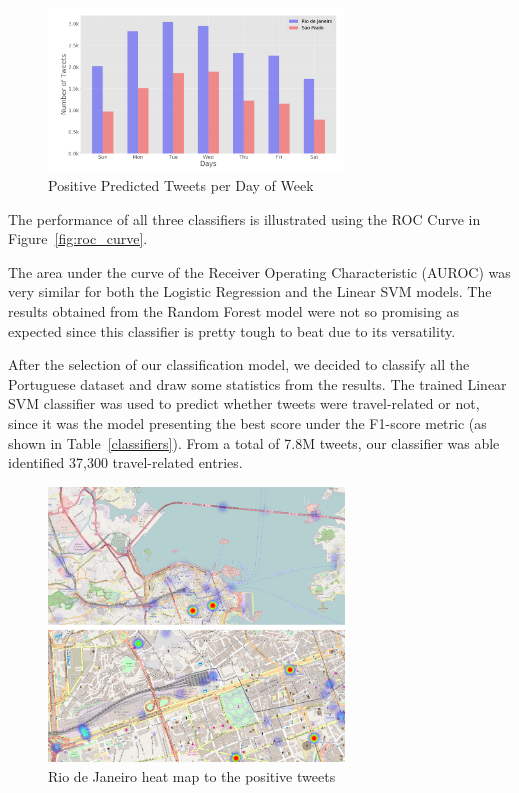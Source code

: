 \begin{figure}[!hbp]
	\centering
	\includegraphics[width=0.7\textwidth]{figures/predicted_day_of_week}
	\caption{Positive Predicted Tweets per Day of Week}
	\label{fig:predicted}
\end{figure}


The performance of all three classifiers is illustrated using the ROC Curve in Figure~\ref{fig:roc_curve}.

The area under the curve of the Receiver Operating Characteristic (AUROC) was very similar for both the Logistic Regression and the Linear SVM models. The results obtained from the Random Forest model were not so promising as expected since this classifier is pretty tough to beat due to its versatility.

After the selection of our classification model, we decided to classify all the Portuguese dataset and draw some statistics from the results. The trained Linear SVM classifier was used to predict whether tweets were travel-related or not, since it was the model presenting the best score under the F1-score metric (as shown in Table~\ref{classifiers}). From a total of 7.8M tweets, our classifier was able identified 37,300 travel-related entries.

\begin{figure}[!bp]
	\centering
	\includegraphics[width=0.7\textwidth]{figures/rio_1}
	\caption{Rio de Janeiro heat map to the positive tweets}
	\label{subfig:rio_heatmap}
\end{figure}

